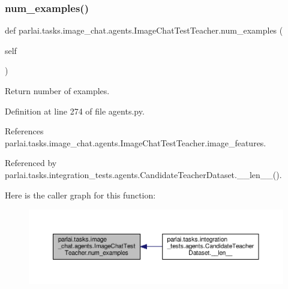 \subsubsection{\texorpdfstring{num\+\_\+examples()}{num\_examples()}}
{\footnotesize\ttfamily def parlai.\+tasks.\+image\+\_\+chat.\+agents.\+Image\+Chat\+Test\+Teacher.\+num\+\_\+examples (\begin{DoxyParamCaption}\item[{}]{self }\end{DoxyParamCaption})}

\begin{DoxyVerb}Return number of examples.\end{DoxyVerb}
 

Definition at line 274 of file agents.\+py.



References parlai.\+tasks.\+image\+\_\+chat.\+agents.\+Image\+Chat\+Test\+Teacher.\+image\+\_\+features.



Referenced by parlai.\+tasks.\+integration\+\_\+tests.\+agents.\+Candidate\+Teacher\+Dataset.\+\_\+\+\_\+len\+\_\+\+\_\+().

Here is the caller graph for this function\+:
\nopagebreak
\begin{figure}[H]
\begin{center}
\leavevmode
\includegraphics[width=350pt]{classparlai_1_1tasks_1_1image__chat_1_1agents_1_1ImageChatTestTeacher_a5e5478cfc559bafed513c2421da53662_icgraph}
\end{center}
\end{figure}
\mbox{\label{classparlai_1_1tasks_1_1image__chat_1_1agents_1_1ImageChatTestTeacher_ad1e01dc7e43fdba0bd7d82b1ac860e83}} 

